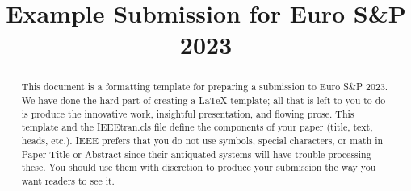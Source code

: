 \documentclass[compsoc, conference, a4paper, 10pt, times]{IEEEtran}
\begin{document}
\title{Example Submission for Euro S\&P 2023}


\iffalse
\author{\IEEEauthorblockN{1\textsuperscript{st} Given Names Surname}
\IEEEauthorblockA{\textit{Affiliation} \\
City, Country \\
email address or website URL}
\and
\IEEEauthorblockN{2\textsuperscript{nd} Given Names Surname}
\IEEEauthorblockA{\textit{Affiliation} \\
City, Country \\
email address or website URL}
\and
\IEEEauthorblockN{3\textsuperscript{rd} Given Names Surname}
\IEEEauthorblockA{\textit{Affiliation} \\
City, Country \\
email address or website URL}
}
\fi

\maketitle

\begin{abstract}
This document is a formatting template for preparing a submission to Euro S\&P 2023. We have done the hard part of creating a LaTeX template; all that is left to you to do is produce the innovative work, insightful presentation, and flowing prose. This template and the IEEEtran.cls file define the components of your paper (title, text, heads, etc.). IEEE prefers that you do not use symbols, special characters, or math in Paper Title or Abstract since their antiquated systems will have trouble processing these. You should use them with discretion to produce your submission the way you want readers to see it.
\end{abstract}


\end{document}
